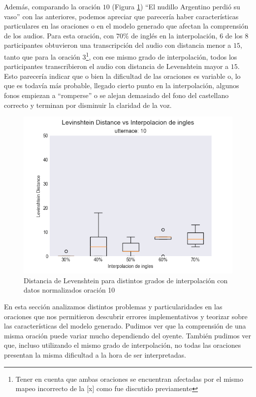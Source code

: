 
Además, comparando la oración $10$ (Figura \ref{boxplot:fig10}) ``El nudillo Argentino perdió su vaso'' con las anteriores, podemos apreciar que parecería haber características particulares en las oraciones o en el modelo generado que afectan la comprensión de los audios. Para esta oración, con $70\%$ de inglés en la interpolación, $6$ de los $8$ participantes obtuvieron una transcripción del audio con distancia menor a $15$, tanto que para la oración $3$\footnote{Tener en cuenta que ambas oraciones se encuentran afectadas por el mismo mapeo incorrecto de la [x] como fue discutido previamente}, con ese mismo grado de interpolación, todos los participantes transcribieron el audio con distancia de Levenshtein mayor a $15$. Esto parecería indicar que o bien la dificultad de las oraciones es variable o, lo que es todavía más probable, llegado cierto punto en la interpolación, algunos fonos empiezan a ``romperse'' o se alejan demasiado del fono del castellano correcto y terminan por disminuir la claridad de la voz.

\begin{figure}
\begin{center}
\includegraphics[trim={0 0 0 1.25cm},clip,width=.5\textwidth]{imagenes/plots_normalized/10.png}
\end{center}
\caption{Distancia de Levenshtein para distintos grados de interpolación con datos normalizados oración 10}
\label{boxplot:fig10}
\end{figure}

En esta sección analizamos distintos problemas y particularidades en las oraciones que nos permitieron descubrir errores implementativos y teorizar sobre las características del modelo generado. Pudimos ver que la comprensión de una misma oración puede variar mucho dependiendo del oyente. También pudimos ver que, incluso utilizando el mismo grado de interpolación, no todas las oraciones presentan la misma dificultad a la hora de ser interpretadas.

